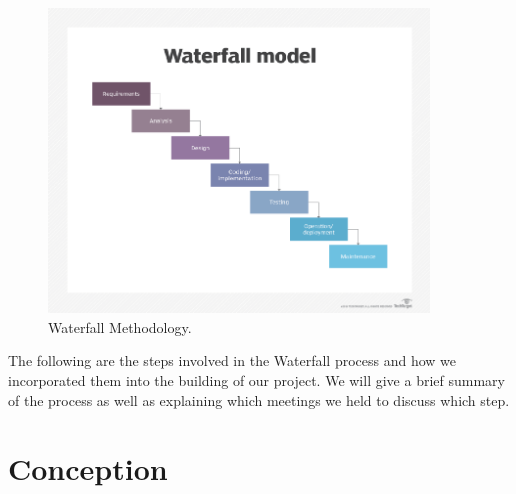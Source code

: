 \begin{figure}[h!]
	\caption{Waterfall Methodology.}
	\label{image:myImageName}
	\centering
	\includegraphics[width=0.9\textwidth]{Fig images/waterfall.png}
\end{figure}

The following are the steps involved in the Waterfall process and how we incorporated them into the building of our project. We will give a brief summary of the process as well as explaining which meetings we held to discuss which step. 

\section{Conception}


